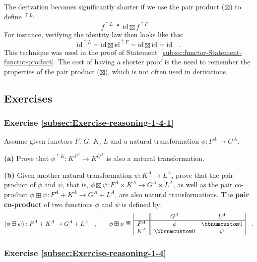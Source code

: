 The derivation becomes significantly shorter if we use the pair product
($\boxtimes$) to define $^{\uparrow L}$:
\[
f^{\uparrow L}\triangleq\text{id}\boxtimes f^{\uparrow F}\quad.
\]
For instance, verifying the identity law then looks like this:
\[
\text{id}^{\uparrow L}=\text{id}\boxtimes\text{id}^{\uparrow F}=\text{id}\boxtimes\text{id}=\text{id}\quad.
\]
This technique was used in the proof of Statement~\ref{subsec:functor-Statement-functor-product}.
The cost of having a shorter proof is the need to remember the properties
of the pair product ($\boxtimes$), which is not often used in derivations.

\subsection{Exercises}

\subsubsection{Exercise \label{subsec:Exercise-reasoning-1-4-1}\ref{subsec:Exercise-reasoning-1-4-1}}

Assume given functors $F$, $G$, $K$, $L$ and a natural transformation
$\phi:F^{A}\rightarrow G^{A}$.

\textbf{(a)} Prove that $\phi^{\uparrow K}:K^{F^{A}}\rightarrow K^{G^{A}}$
is also a natural transformation.

\textbf{(b)} Given another natural transformation $\psi:K^{A}\rightarrow L^{A}$,
prove that the pair product of $\phi$ and $\psi$, that is, $\phi\boxtimes\psi:F^{A}\times K^{A}\rightarrow G^{A}\times L^{A}$,
as well as the pair co-product $\phi\boxplus\psi:F^{A}+K^{A}\rightarrow G^{A}+L^{A}$,
are also natural transformations. The \textbf{pair co-product}
of two functions $\phi$ and $\psi$ is defined by:
\[
(\phi\boxplus\psi):F^{A}+K^{A}\rightarrow G^{A}+L^{A}\quad,\quad\quad\phi\boxplus\psi\triangleq\,\begin{array}{|c||cc|}
 & G^{A} & L^{A}\\
\hline F^{A} & \phi & \bbnum 0\\
K^{A} & \bbnum 0 & \psi
\end{array}\quad.
\]


\subsubsection{Exercise \label{subsec:Exercise-reasoning-1-4}\ref{subsec:Exercise-reasoning-1-4}}

